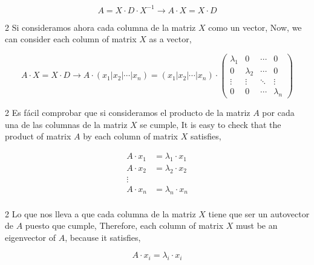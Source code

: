 \begin{equation*}
 A=X \cdot D \cdot X^{-1}\rightarrow A\cdot X= X\cdot D
\end{equation*}
\begin{paracol}{2}
Si consideramos ahora cada columna de la matriz $X$ como un vector,
\switchcolumn
Now, we can consider each column of matrix $X$ as a vector,
\end{paracol}
\begin{equation*}
A\cdot X= X\cdot D \rightarrow A\cdot \left( x_1 | x_2 | \cdots | x_n \right)= \left( x_1 | x_2 | \cdots | x_n \right) \cdot\begin{pmatrix}
\lambda_1& 0 & \cdots & 0\\
0& \lambda_2& \cdots & 0\\
\vdots & \vdots& \ddots & \vdots\\
0& 0& \cdots & \lambda_n
\end{pmatrix}
\end{equation*}
\begin{paracol}{2}
Es fácil comprobar que si consideramos el producto de la matriz $A$ por cada una de las columnas de la matriz $X$ se cumple,
\switchcolumn
It is easy to check that the product of matrix $A$ by each column of matrix $X$ satisfies, 
\end{paracol}
\begin{align*}
A\cdot x_1 &=\lambda_1 \cdot x_1 \\
A\cdot x_2 &=\lambda_2 \cdot x_2 \\
\vdots \\
A\cdot x_n &=\lambda_n \cdot x_n \\
\end{align*}
\begin{paracol}{2}
Lo que nos lleva a que cada columna de la matriz $X$ tiene que ser un autovector de $A$ puesto que cumple,
\switchcolumn
Therefore, each column of matrix $X$ must be an eigenvector of $A$, because it satisfies,
\end{paracol}
\begin{equation*}
A\cdot x_i =\lambda_i \cdot x_i
\end{equation*}
